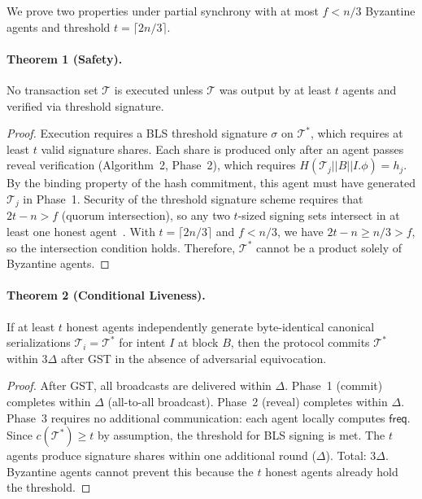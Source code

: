 \documentclass[11pt]{article}
\begin{document}
We prove two properties under partial synchrony with at most $f < n/3$ Byzantine agents and threshold $t = \lceil 2n/3 \rceil$.

\paragraph{Theorem 1 (Safety).} No transaction set $\mathcal{T}$ is executed unless $\mathcal{T}$ was output by at least $t$ agents and verified via threshold signature.

\begin{proof}
Execution requires a BLS threshold signature $\sigma$ on $\mathcal{T}^*$, which requires at least $t$ valid signature shares. Each share is produced only after an agent passes reveal verification (Algorithm~2, Phase~2), which requires $H(\mathcal{T}_j || B || I.\phi) = h_j$. By the binding property of the hash commitment, this agent must have generated $\mathcal{T}_j$ in Phase~1. Security of the threshold signature scheme requires that $2t - n > f$ (quorum intersection), so any two $t$-sized signing sets intersect in at least one honest agent~\cite{boldyreva2003}. With $t = \lceil 2n/3 \rceil$ and $f < n/3$, we have $2t - n \ge n/3 > f$, so the intersection condition holds. Therefore, $\mathcal{T}^*$ cannot be a product solely of Byzantine agents.
\end{proof}

\paragraph{Theorem 2 (Conditional Liveness).} If at least $t$ honest agents independently generate byte-identical canonical serializations $\mathcal{T}_i = \mathcal{T}^*$ for intent $I$ at block $B$, then the protocol commits $\mathcal{T}^*$ within $3\Delta$ after GST in the absence of adversarial equivocation.

\begin{proof}
After GST, all broadcasts are delivered within $\Delta$. Phase~1 (commit) completes within $\Delta$ (all-to-all broadcast). Phase~2 (reveal) completes within $\Delta$. Phase~3 requires no additional communication: each agent locally computes $\mathsf{freq}$. Since $c(\mathcal{T}^*) \ge t$ by assumption, the threshold for BLS signing is met. The $t$ agents produce signature shares within one additional round ($\Delta$). Total: $3\Delta$. Byzantine agents cannot prevent this because the $t$ honest agents already hold the threshold.
\end{proof}
\end{document}
